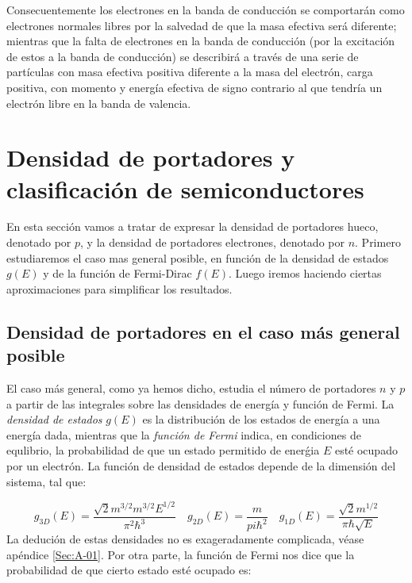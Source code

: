 Consecuentemente los electrones en la banda de conducción se comportarán como electrones normales libres por la salvedad de que la masa efectiva será diferente; mientras que la falta de electrones en la banda de conducción (por la excitación de estos a la banda de conducción) se describirá a través de una serie de partículas con masa efectiva positiva diferente a la masa del electrón, carga positiva, con momento y energía efectiva de signo contrario al que tendría un electrón libre en la banda de valencia.



\section{Densidad de portadores y clasificación de semiconductores}

En esta sección vamos a tratar de expresar la densidad de portadores hueco, denotado por $p$, y la densidad de portadores electrones, denotado por $n$. Primero estudiaremos el caso mas general posible, en función de la densidad de estados $g(E)$ y de la función de Fermi-Dirac $f(E)$. Luego iremos haciendo ciertas aproximaciones para simplificar los resultados.

\subsection{Densidad de portadores en el caso más general posible}

El caso más general, como ya hemos dicho, estudia el número de portadores $n$ y $p$ a partir de las integrales sobre las densidades de energía y función de Fermi. La \textit{densidad de estados} $g(E)$ es la distribución de los estados de energía a una energía dada, mientras que la \textit{función de Fermi} indica, en condiciones de equlibrio, la probabilidad de que un estado permitido de enerǵia $E$ esté ocupado por un electrón. La función de densidad de estados depende de la dimensión del sistema, tal que:

\begin{equation}
	g_{3D} (E) = \frac{\sqrt{2}m^{3/2}m^{3/2}E^{1/2}}{\pi^2 \hbar^3} \quad g_{2D} (E) = \frac{m}{pi \hbar^2} \quad g_{1D} (E) = \frac{\sqrt{2}m^{1/2}}{\pi \hbar \sqrt{E}}
\end{equation}
La dedución de estas densidades no es exageradamente complicada, véase apéndice \ref{Sec:A-01}. Por otra parte, la función de Fermi nos dice que la probabilidad de que cierto estado esté ocupado es: 


